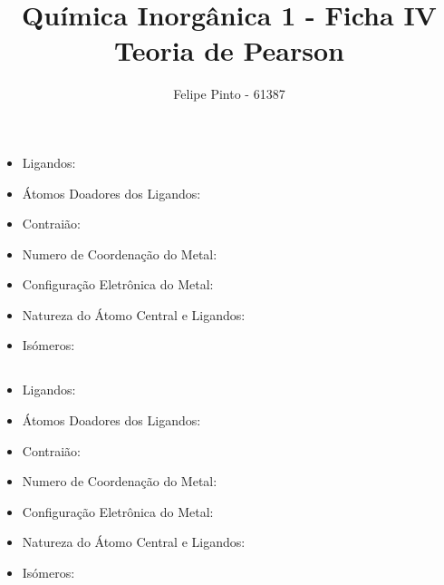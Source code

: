 \documentclass[12pt]{article}
\begin{document}
\title{\bfseries\color{DarkGreen!75!}%
	Química Inorgânica 1 - Ficha IV\\Teoria de Pearson%
}
\author{Felipe Pinto - 61387}

\maketitle
\tableofcontents
\break

\section{}

\subsection{}
\begin{itemize}

	\item Ligandos:
	
	\item Átomos Doadores dos Ligandos:
	
	\item Contraião:
	
	\item Numero de Coordenação do Metal:
	
	\item Configuração Eletrônica do Metal:
	
	\item Natureza do Átomo Central e Ligandos:
	
	\item Isómeros:

\end{itemize}

\break

\subsection{}
\begin{itemize}

	\item Ligandos:
	
	\item Átomos Doadores dos Ligandos:
	
	\item Contraião:
	
	\item Numero de Coordenação do Metal:
	
	\item Configuração Eletrônica do Metal:
	
	\item Natureza do Átomo Central e Ligandos:
	
	\item Isómeros:

\end{itemize}
\end{document}
